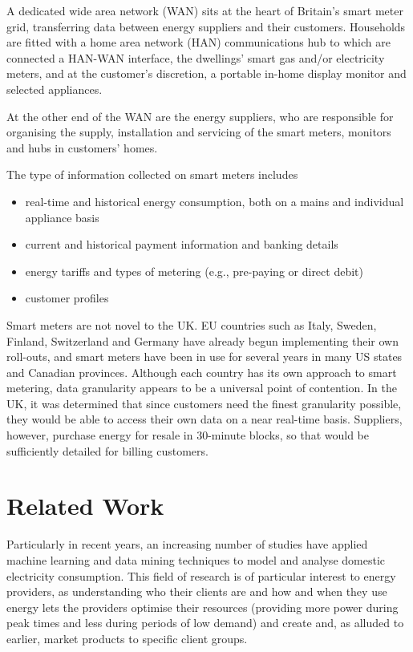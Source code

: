 A dedicated wide area network (WAN) sits at the heart of Britain's smart meter grid, transferring data between energy suppliers and their customers.  Households are fitted with a home area network (HAN) communications hub to which are connected a HAN-WAN interface, the dwellings' smart gas and/or electricity meters, and at the customer's discretion, a portable in-home display monitor and selected appliances.

At the other end of the WAN are the energy suppliers, who are responsible for organising the supply, installation and servicing of the smart meters, monitors and hubs in customers' homes\cite{DECC_4}.  

The type of information collected on smart meters includes\cite{Anderson}
\begin{itemize}
\item real-time and historical energy consumption, both on a mains and individual appliance basis
\item current and historical payment information and banking details
\item energy tariffs and types of metering (e.g., pre-paying or direct debit)
\item customer profiles
\end{itemize}

Smart meters are not novel to the UK.  EU countries such as Italy, Sweden, Finland, Switzerland and Germany have already begun implementing their own roll-outs, and smart meters have been in use for several years in many US states and Canadian provinces. Although each country has its own approach to smart metering, data granularity appears to be a universal point of contention\cite{Murrill,Buttarelli}. In the UK, it was determined that since customers need the finest granularity possible, they would be able to access their own data on a near real-time basis. Suppliers, however, purchase energy for resale in 30-minute blocks, so that would be sufficiently detailed for billing customers\cite{DECC_2,Decc_3}. 

\section{Related Work}
\label{sec:previousWork}
Particularly in recent years, an increasing number of studies have applied machine learning and data mining techniques to model and analyse domestic electricity consumption. This field of research is of particular interest to energy providers, as understanding who their clients are and how and when they use energy lets the providers optimise their resources (providing more power during peak times and less during periods of low demand) and create and, as alluded to earlier, market products to specific client groups.

